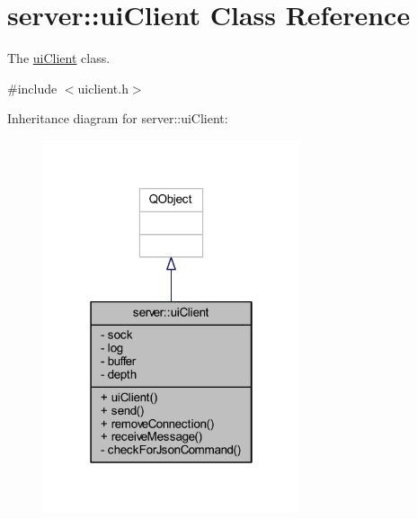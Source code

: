 \hypertarget{classserver_1_1ui_client}{\section{server\-:\-:ui\-Client Class Reference}
\label{dc/d4d/classserver_1_1ui_client}
}


The \hyperlink{classserver_1_1ui_client}{ui\-Client} class.  




{\ttfamily \#include $<$uiclient.\-h$>$}



Inheritance diagram for server\-:\-:ui\-Client\-:\nopagebreak
\begin{figure}[H]
\begin{center}
\leavevmode
\includegraphics[width=214pt]{d3/dbc/classserver_1_1ui_client__inherit__graph}
\end{center}
\end{figure}


